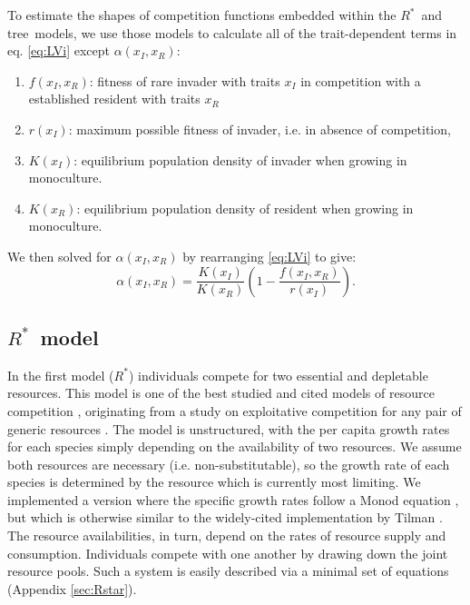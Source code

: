 \documentclass[a4paper,11pt]{article}
\newcommand{\Rstar}{\ensuremath{R^*}}
\newcommand{\TREE}{{\sc tree}}
\begin{document}
To estimate the shapes of competition functions embedded within the \Rstar\
and \TREE\ models, we use those models to calculate all of the trait-dependent
terms in eq. \ref{eq:LVi} except $\alpha(x_I, x_R)$:
\begin{enumerate}
  \item $f(x_I, x_R)$: fitness of rare invader with traits $x_I$  in competition
  with a established resident with traits $x_R$
  \item $r(x_I)$: maximum possible fitness of invader, i.e. in absence of competition,
  \item $K(x_I)$: equilibrium population density of invader when growing in monoculture.
  \item $K(x_R)$: equilibrium population density of resident when growing in
  monoculture.
\end{enumerate}
We then solved for $\alpha(x_I, x_R)$ by rearranging  \ref{eq:LVi} to give:
\begin{equation}
  \label{eq:alpha}
 \alpha(x_I, x_R) = \frac{K(x_I)}{K(x_R)}
  \left(1 - \frac{f(x_I, x_R)}{r(x_I)}\right).
\end{equation}

\subsection{\Rstar\ model}


In the first model (\Rstar) individuals compete for two essential and
depletable resources. This model is one of the best studied and cited models
of resource competition \citep{Tilman-1977, Tilman-1982, Huisman-1999},
originating from a study on exploitative competition for any pair of generic
resources \citep{Leon-1975}. The model is unstructured, with the per capita
growth rates for each species simply depending on the availability of two
resources. We assume both resources are necessary (i.e. non-substitutable), so
the growth rate of each species is determined by the resource which is
currently most limiting. We implemented a version where the specific growth
rates follow a Monod equation \citet{Huisman-1999}, but which is otherwise
similar to the widely-cited implementation by Tilman \citep{Tilman-1977,
Tilman-1982}.  The resource availabilities, in turn, depend on the rates of
resource supply and consumption. Individuals compete with one another by
drawing down the joint resource pools. Such a system is easily described via a
minimal set of equations (Appendix \ref{sec:Rstar}).
\end{document}
